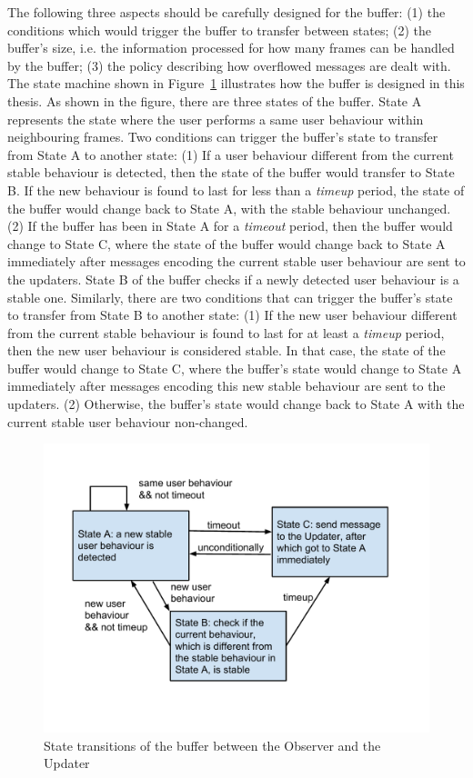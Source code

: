 The following three aspects should be carefully designed for the buffer: (1) the conditions which would trigger the buffer to transfer between states; (2) the buffer's size, i.e. the information processed for how many frames can be handled by the buffer; (3) the policy describing how overflowed messages are dealt with. The state machine shown in Figure~\ref{fig:state-trans} illustrates how the buffer is designed in this thesis. As shown in the figure, there are three states of the buffer. State A represents the state where the user performs a same user behaviour within neighbouring frames. Two conditions can trigger the buffer's state to transfer from State A to another state: (1) If a user behaviour different from the current stable behaviour is detected, then the state of the buffer would transfer to State B. If the new behaviour is found to last for less than a \textit{timeup} period, the state of the buffer would change back to State A, with the stable behaviour unchanged. (2) If the buffer has been in State A for a \textit{timeout} period, then the buffer would change to State C, where the state of the buffer would change back to State A immediately after messages encoding the current stable user behaviour are sent to the updaters. State B of the buffer checks if a newly detected user behaviour is a stable one. Similarly, there are two conditions that can trigger the buffer's state to transfer from State B to another state: (1) If the new user behaviour different from the current stable behaviour is found to last for at least a \textit{timeup} period, then the new user behaviour is considered stable. In that case, the state of the buffer would change to State C, where the buffer's state would change to State A immediately after messages encoding this new stable behaviour are sent to the updaters. (2) Otherwise, the buffer's state would change back to State A with the current stable user behaviour non-changed.

\begin{figure}[htp]
\centering
\includegraphics[trim = 10mm 25mm 16mm 15mm, clip, width=0.8\linewidth]{fig/fig-state-trans.pdf}
\caption{State transitions of the buffer between the Observer and the Updater}
\label{fig:state-trans}
\end{figure}
 

